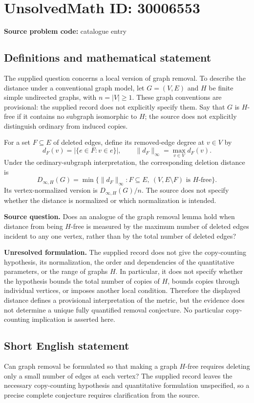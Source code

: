 \documentclass[11pt]{article}
\begin{document}
\section*{UnsolvedMath ID: 30006553}
\textbf{Source problem code:} catalogue entry
\subsection{Definitions and mathematical statement}
The supplied question concerns a local version of graph removal. To describe the distance under a conventional graph model, let \(G=(V,E)\) and \(H\) be finite simple undirected graphs, with \(n=|V|\geq 1\). These graph conventions are provisional: the supplied record does not explicitly specify them. Say that \(G\) is \(H\)-free if it contains no subgraph isomorphic to \(H\); the source does not explicitly distinguish ordinary from induced copies.

For a set \(F\subseteq E\) of deleted edges, define its removed-edge degree at \(v\in V\) by
\[
 d_F(v)=|\{e\in F:v\in e\}|,
 \qquad
 \|d_F\|_\infty=\max_{v\in V}d_F(v).
\]
Under the ordinary-subgraph interpretation, the corresponding deletion distance is
\[
 D_{\infty,H}(G)=
 \min\bigl\{\|d_F\|_\infty:
 F\subseteq E,\ (V,E\setminus F)\text{ is }H\text{-free}\bigr\}.
\]
Its vertex-normalized version is \(D_{\infty,H}(G)/n\). The source does not specify whether the distance is normalized or which normalization is intended.

\textbf{Source question.} Does an analogue of the graph removal lemma hold when distance from being \(H\)-free is measured by the maximum number of deleted edges incident to any one vertex, rather than by the total number of deleted edges?

\textbf{Unresolved formulation.} The supplied record does not give the copy-counting hypothesis, its normalization, the order and dependencies of the quantitative parameters, or the range of graphs \(H\). In particular, it does not specify whether the hypothesis bounds the total number of copies of \(H\), bounds copies through individual vertices, or imposes another local condition. Therefore the displayed distance defines a provisional interpretation of the metric, but the evidence does not determine a unique fully quantified removal conjecture. No particular copy-counting implication is asserted here.
\subsection{Short English statement}
Can graph removal be formulated so that making a graph \(H\)-free requires deleting only a small number of edges at each vertex? The supplied record leaves the necessary copy-counting hypothesis and quantitative formulation unspecified, so a precise complete conjecture requires clarification from the source.
\end{document}

